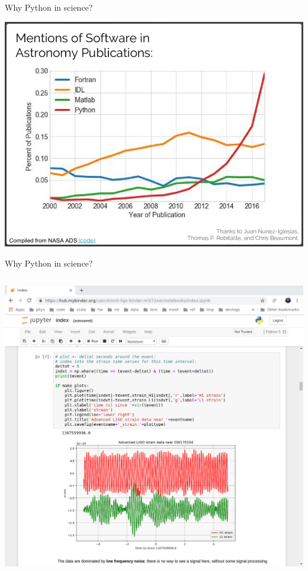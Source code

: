 \documentclass[aspectratio=169]{beamer}
\begin{document}
\begin{frame}{Why Python in science?}
\vspace{0.25 cm}
\begin{center}
\includegraphics[width=0.7\linewidth]{mentions-of-programming-languages.png}
\end{center}
\end{frame}

\begin{frame}{Why Python in science?}
\vspace{0.3 cm}
\begin{columns}[b]
\includegraphics[width=\linewidth]{lsst-notebook.png}
\end{columns}
\end{frame}
\end{document}
